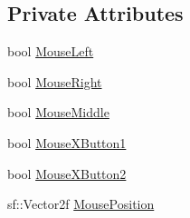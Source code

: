 \subsection*{Private Attributes}
\begin{DoxyCompactItemize}
\item 
bool \hyperlink{class_mouse_ace644d872e798ce789726ec958236428}{Mouse\-Left}
\item 
bool \hyperlink{class_mouse_a0d7dd53605221594b161f9d8e61aa345}{Mouse\-Right}
\item 
bool \hyperlink{class_mouse_a4cbf96ff26822cc0eb8ea3f73a9edc9a}{Mouse\-Middle}
\item 
bool \hyperlink{class_mouse_af909f12e58b2b80528c5ca05d0452bda}{Mouse\-X\-Button1}
\item 
bool \hyperlink{class_mouse_ade6dd013286bf4829948f8a69d9b7f8a}{Mouse\-X\-Button2}
\item 
sf\-::\-Vector2f \hyperlink{class_mouse_ae83f237e6ca4e0f366eb6f1a03964886}{Mouse\-Position}
\end{DoxyCompactItemize}


